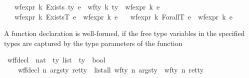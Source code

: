 \begin{isabellebody}
\ \ {\isacharbar}{\kern0pt}\ {\isachardoublequoteopen}wf{\isacharunderscore}{\kern0pt}expr\ k\ {\isacharparenleft}{\kern0pt}Exists\ ty\ e{\isacharparenright}{\kern0pt}\ {\isacharequal}{\kern0pt}\ {\isacharparenleft}{\kern0pt}{\isacharparenleft}{\kern0pt}wf{\isacharunderscore}{\kern0pt}ty\ k\ ty{\isacharparenright}{\kern0pt}\ {\isasymand}\ {\isacharparenleft}{\kern0pt}wf{\isacharunderscore}{\kern0pt}expr\ k\ e{\isacharparenright}{\kern0pt}{\isacharparenright}{\kern0pt}{\isachardoublequoteclose}\isanewline
\ \ {\isacharbar}{\kern0pt}\ {\isachardoublequoteopen}wf{\isacharunderscore}{\kern0pt}expr\ k\ {\isacharparenleft}{\kern0pt}ExistsT\ e{\isacharparenright}{\kern0pt}\ {\isacharequal}{\kern0pt}\ {\isacharparenleft}{\kern0pt}wf{\isacharunderscore}{\kern0pt}expr\ {\isacharparenleft}{\kern0pt}k{\isacharplus}{\kern0pt}{}{\isacharparenright}{\kern0pt}\ e{\isacharparenright}{\kern0pt}{\isachardoublequoteclose}\isanewline
\ \ {\isacharbar}{\kern0pt}\ {\isachardoublequoteopen}wf{\isacharunderscore}{\kern0pt}expr\ k\ {\isacharparenleft}{\kern0pt}ForallT\ e{\isacharparenright}{\kern0pt}\ {\isacharequal}{\kern0pt}\ {\isacharparenleft}{\kern0pt}wf{\isacharunderscore}{\kern0pt}expr\ {\isacharparenleft}{\kern0pt}k{\isacharplus}{\kern0pt}{}{\isacharparenright}{\kern0pt}\ e{\isacharparenright}{\kern0pt}{\isachardoublequoteclose}%
\begin{isamarkuptext}%
A function declaration is well-formed, if the free type variables in the specified types are 
captured by the type parameters of the function%
\end{isamarkuptext}\isamarkuptrue%
\isamarkupfalse%
\ wf{\isacharunderscore}{\kern0pt}fdecl\ {\isacharcolon}{\kern0pt}{\isacharcolon}{\kern0pt}\ {\isachardoublequoteopen}{\isacharparenleft}{\kern0pt}nat\ {\isasymtimes}\ ty\ list\ {\isasymtimes}\ ty{\isacharparenright}{\kern0pt}\ {\isasymRightarrow}\ bool{\isachardoublequoteclose}\isanewline
\ \ \ \isanewline
\ \ \ \ {\isachardoublequoteopen}wf{\isacharunderscore}{\kern0pt}fdecl\ {\isacharparenleft}{\kern0pt}n{\isacharcomma}{\kern0pt}\ args{\isacharunderscore}{\kern0pt}ty{\isacharcomma}{\kern0pt}\ ret{\isacharunderscore}{\kern0pt}ty{\isacharparenright}{\kern0pt}\ {\isacharequal}{\kern0pt}\ {\isacharparenleft}{\kern0pt}{\isacharparenleft}{\kern0pt}list{\isacharunderscore}{\kern0pt}all\ {\isacharparenleft}{\kern0pt}wf{\isacharunderscore}{\kern0pt}ty\ n{\isacharparenright}{\kern0pt}\ args{\isacharunderscore}{\kern0pt}ty{\isacharparenright}{\kern0pt}\ {\isasymand}\ {\isacharparenleft}{\kern0pt}wf{\isacharunderscore}{\kern0pt}ty\ n\ ret{\isacharunderscore}{\kern0pt}ty{\isacharparenright}{\kern0pt}{\isacharparenright}{\kern0pt}{\isachardoublequoteclose}\isanewline

\end{isabellebody}
